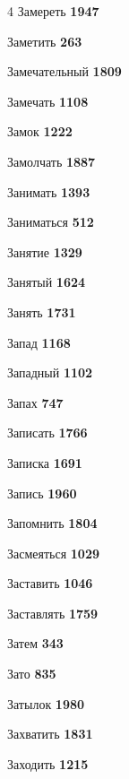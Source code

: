 \begin{multicols}{4}
\noindent Замереть \dotfill \textbf{\color{secondary} 1947}\par
\noindent Заметить \dotfill \textbf{\color{secondary} 263}\par
\noindent Замечательный \dotfill \textbf{\color{secondary} 1809}\par
\noindent Замечать \dotfill \textbf{\color{secondary} 1108}\par
\noindent Замок \dotfill \textbf{\color{secondary} 1222}\par
\noindent Замолчать \dotfill \textbf{\color{secondary} 1887}\par
\noindent Занимать \dotfill \textbf{\color{secondary} 1393}\par
\noindent Заниматься \dotfill \textbf{\color{secondary} 512}\par
\noindent Занятие \dotfill \textbf{\color{secondary} 1329}\par
\noindent Занятый \dotfill \textbf{\color{secondary} 1624}\par
\noindent Занять \dotfill \textbf{\color{secondary} 1731}\par
\noindent Запад \dotfill \textbf{\color{secondary} 1168}\par
\noindent Западный \dotfill \textbf{\color{secondary} 1102}\par
\noindent Запах \dotfill \textbf{\color{secondary} 747}\par
\noindent Записать \dotfill \textbf{\color{secondary} 1766}\par
\noindent Записка \dotfill \textbf{\color{secondary} 1691}\par
\noindent Запись \dotfill \textbf{\color{secondary} 1960}\par
\noindent Запомнить \dotfill \textbf{\color{secondary} 1804}\par
\noindent Засмеяться \dotfill \textbf{\color{secondary} 1029}\par
\noindent Заставить \dotfill \textbf{\color{secondary} 1046}\par
\noindent Заставлять \dotfill \textbf{\color{secondary} 1759}\par
\noindent Затем \dotfill \textbf{\color{secondary} 343}\par
\noindent Зато \dotfill \textbf{\color{secondary} 835}\par
\noindent Затылок \dotfill \textbf{\color{secondary} 1980}\par
\noindent Захватить \dotfill \textbf{\color{secondary} 1831}\par
\noindent Заходить \dotfill \textbf{\color{secondary} 1215}\par

\end{multicols}
